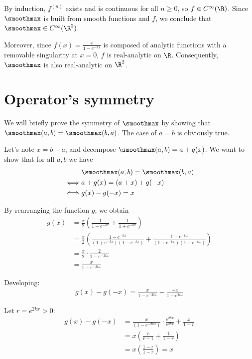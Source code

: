 By induction, $f^{(n)}$ exists and is continuous for all $n \geq 0$, so $f \in C^\infty(\R)$. Since $\smoothmax$ is built from smooth functions and $f$, we conclude that $\smoothmax \in C^\infty(\R^2)$.

\smallConclusion

Moreover, since $f(x) = \frac{x}{1 - e^{-kx}}$ is composed of analytic functions with a removable singularity at $x = 0$, $f$ is real-analytic on $\R$. Consequently, $\smoothmax$ is also real-analytic on $\R^2$.

\section{Operator's symmetry}
We will briefly prove the symmetry of $\smoothmax$ by showing that $\smoothmax(a, b) = \smoothmax(b, a)$. The case of $a = b$ is obviously true.

Let's note $x = b - a$, and decompose $\smoothmax(a, b) = a + g(x)$. We want to show that for all $a, b$ we have
\begin{align}
    & \smoothmax(a, b) = \smoothmax(b, a) \\
    \iff& a + g(x) = (a + x) + g(-x) \\
    \iff& g(x) - g(-x) = x
\end{align}

By rearranging the function $g$, we obtain 
\begin{align}
    g(x) &= \frac{x}{2} \left( \frac{1}{1 - e^{-kx}} + \frac{1}{1 + e^{-kx}} \right) \\
    &= \frac{x}{2} \left( \frac{1 - e^{-kx}}{(1 + e^{-kx})(1 - e^{-kx})} + \frac{1 + e^{-kx}}{(1 + e^{-kx})(1 - e^{-kx})} \right) \\
    &= \frac{x}{2} \cdot \frac{2}{1 - e^{-2kx}} \\
    &= \frac{x}{1 - e^{-2kx}}
\end{align}


Developing:
\begin{align}
    g(x) - g(-x) = \frac{x}{1 - e^{-2kx}} - \frac{-x}{1 - e^{2kx}}
\end{align}

Let $r = e^{2kx} > 0$:
\begin{align}
    g(x) - g(-x) &= \frac{x}{(1 - e^{-2kx})} \cdot \frac{e^{2kx}}{e^{2kx}} + \frac{x}{1 - r} \\
    &= x \left( \frac{r}{r - 1} + \frac{1}{1 - r} \right) \\
    &= x \left( \frac{1 - r}{1 - r} \right) = x
\end{align}

